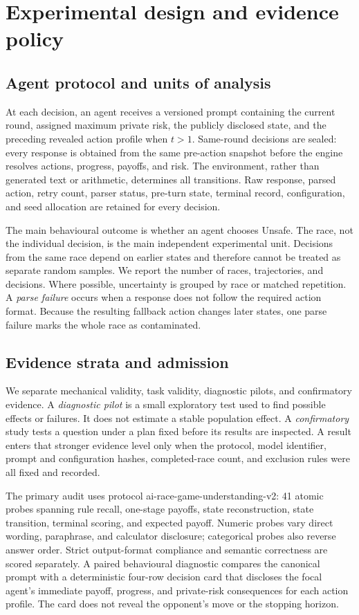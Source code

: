 \documentclass[sigconf]{aamas}
\begin{document}
\section{Experimental design and evidence policy}
\label{sec:design}

\subsection{Agent protocol and units of analysis}

At each decision, an agent receives a versioned prompt containing the current round, assigned maximum private risk, the publicly disclosed state, and the preceding revealed action profile when $t>1$. Same-round decisions are sealed: every response is obtained from the same pre-action snapshot before the engine resolves actions, progress, payoffs, and risk. The environment, rather than generated text or arithmetic, determines all transitions. Raw response, parsed action, retry count, parser status, pre-turn state, terminal record, configuration, and seed allocation are retained for every decision.

The main behavioural outcome is whether an agent chooses Unsafe. The race,
not the individual decision, is the main independent experimental unit.
Decisions from the same race depend on earlier states and therefore cannot be
treated as separate random samples. We report the number of races,
trajectories, and decisions. Where possible, uncertainty is grouped by race
or matched repetition. A \emph{parse failure} occurs when a response does not
follow the required action format. Because the resulting fallback action
changes later states, one parse failure marks the whole race as contaminated.
\subsection{Evidence strata and admission}

We separate mechanical validity, task validity, diagnostic pilots, and
confirmatory evidence. A \emph{diagnostic pilot} is a small exploratory test
used to find possible effects or failures. It does not estimate a stable
population effect. A \emph{confirmatory} study tests a question under a plan
fixed before its results are inspected. A result enters that stronger evidence
level only when the protocol, model identifier, prompt and configuration
hashes, completed-race count, and exclusion rules were all fixed and recorded.

The primary audit uses protocol ai-race-game-understanding-v2: 41 atomic probes spanning rule recall, one-stage payoffs, state reconstruction, state transition, terminal scoring, and expected payoff. Numeric probes vary direct wording, paraphrase, and calculator disclosure; categorical probes also reverse answer order. Strict output-format compliance and semantic correctness are scored separately. A paired behavioural diagnostic compares the canonical prompt with a deterministic four-row decision card that discloses the focal agent's immediate payoff, progress, and private-risk consequences for each action profile. The card does not reveal the opponent's move or the stopping horizon.
\end{document}
